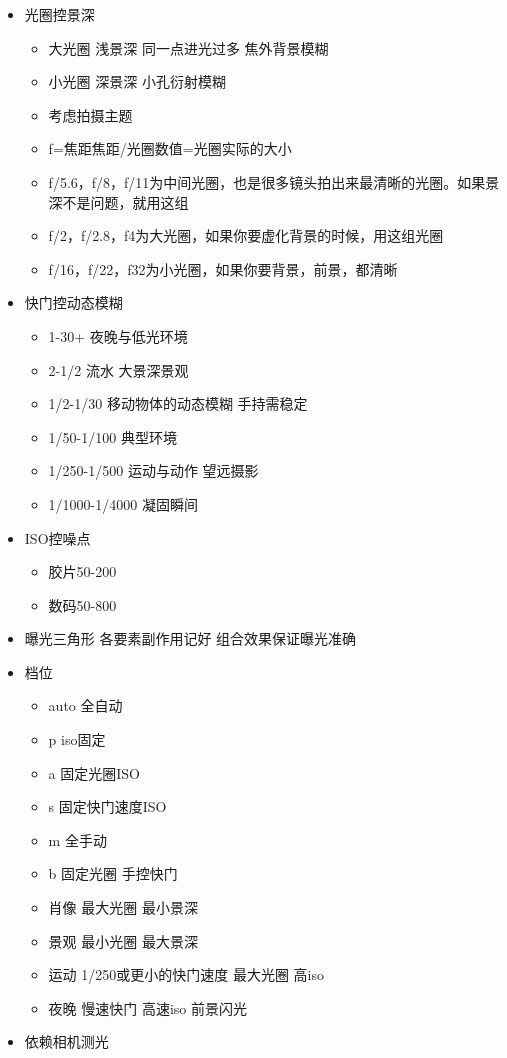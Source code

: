 \documentclass[
  letterpaper,
  DIV=11,
  numbers=noendperiod]{scrreprt}
\providecommand{\tightlist}{%
  \setlength{\itemsep}{0pt}\setlength{\parskip}{0pt}}\usepackage{longtable,booktabs,array}
\begin{document}
\begin{itemize}
\tightlist
\item
  光圈控景深

  \begin{itemize}
  \tightlist
  \item
    大光圈 浅景深 同一点进光过多 焦外背景模糊
  \item
    小光圈 深景深 小孔衍射模糊
  \item
    考虑拍摄主题
  \item
    f=焦距焦距/光圈数值=光圈实际的大小
  \item
    f/5.6，f/8，f/11为中间光圈，也是很多镜头拍出来最清晰的光圈。如果景深不是问题，就用这组
  \item
    f/2，f/2.8，f4为大光圈，如果你要虚化背景的时候，用这组光圈
  \item
    f/16，f/22，f32为小光圈，如果你要背景，前景，都清晰
  \end{itemize}
\item
  快门控动态模糊

  \begin{itemize}
  \tightlist
  \item
    1-30+ 夜晚与低光环境
  \item
    2-1/2 流水 大景深景观
  \item
    1/2-1/30 移动物体的动态模糊 手持需稳定
  \item
    1/50-1/100 典型环境
  \item
    1/250-1/500 运动与动作 望远摄影
  \item
    1/1000-1/4000 凝固瞬间
  \end{itemize}
\item
  ISO控噪点

  \begin{itemize}
  \tightlist
  \item
    胶片50-200
  \item
    数码50-800
  \end{itemize}
\item
  曝光三角形 各要素副作用记好 组合效果保证曝光准确
\item
  档位

  \begin{itemize}
  \tightlist
  \item
    auto 全自动
  \item
    p iso固定
  \item
    a 固定光圈ISO
  \item
    s 固定快门速度ISO
  \item
    m 全手动
  \item
    b 固定光圈 手控快门
  \item
    肖像 最大光圈 最小景深
  \item
    景观 最小光圈 最大景深
  \item
    运动 1/250或更小的快门速度 最大光圈 高iso
  \item
    夜晚 慢速快门 高速iso 前景闪光
  \end{itemize}
\item
  依赖相机测光
\end{itemize}
\end{document}
